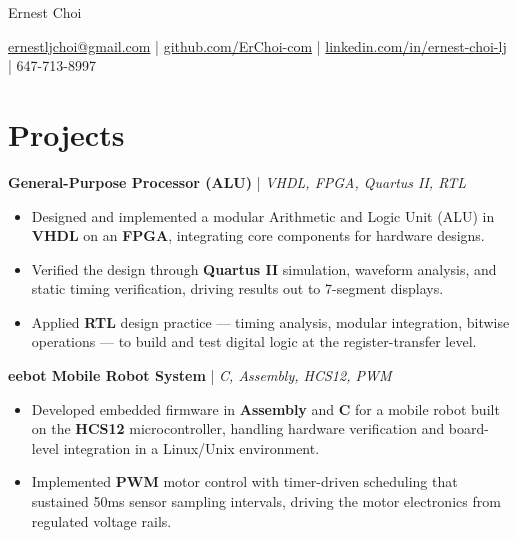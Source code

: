\documentclass[11pt]{article}
\begin{document}
\centerline{\Huge Ernest Choi}
\vspace{3pt}

\centerline{%
  \href{mailto:ernestljchoi@gmail.com}{ernestljchoi@gmail.com} |
  \href{https://www.github.com/ErChoi-com}{github.com/ErChoi-com} |
  \href{https://www.linkedin.com/in/ernest-choi-lj}{linkedin.com/in/ernest-choi-lj} |
  647-713-8997
}


\section*{Projects}

\textbf{General-Purpose Processor (ALU)} | \textit{VHDL, FPGA, Quartus II, RTL} \\ %
\begin{itemize}
  \item Designed and implemented a modular Arithmetic and Logic Unit (ALU) in \textbf{VHDL} on an \textbf{FPGA}, integrating core components for hardware designs.
  \item Verified the design through \textbf{Quartus II} simulation, waveform analysis, and static timing verification, driving results out to 7-segment displays.
  \item Applied \textbf{RTL} design practice — timing analysis, modular integration, bitwise operations — to build and test digital logic at the register-transfer level.
\end{itemize}

\textbf{eebot Mobile Robot System} | \textit{C, Assembly, HCS12, PWM} \\ %
\begin{itemize}
  \item Developed embedded firmware in \textbf{Assembly} and \textbf{C} for a mobile robot built on the \textbf{HCS12} microcontroller, handling hardware verification and board-level integration in a Linux/Unix environment.
  \item Implemented \textbf{PWM} motor control with timer-driven scheduling that sustained 50ms sensor sampling intervals, driving the motor electronics from regulated voltage rails.
\end{itemize}
\end{document}
